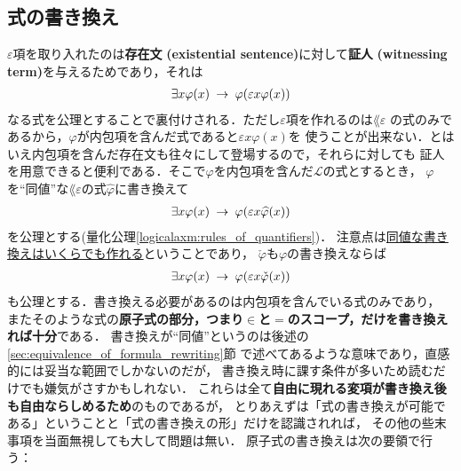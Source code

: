 \subsection{式の書き換え}
\label{subsec:formula_rewriting}
	$\varepsilon$項を取り入れたのは{\bf 存在文}
	{\bf (existential sentence)}に対して{\bf 証人}
	{\bf (witnessing term)}を与えるためであり，それは
	\begin{align}
		\exists x \varphi(x) \hspace{0.25em}\rightarrow\hspace{0.25em} \varphi(\varepsilon x \varphi(x))
	\end{align}
	なる式を公理とすることで裏付けされる．ただし$\varepsilon$項を作れるのは$\lang{\varepsilon}$
	の式のみであるから，$\varphi$が内包項を含んだ式であると$\varepsilon x \varphi(x)$を
	使うことが出来ない．とはいえ内包項を含んだ存在文も往々にして登場するので，それらに対しても
	証人を用意できると便利である．そこで$\varphi$を内包項を含んだ$\mathcal{L}$の式とするとき，
	$\varphi$を``同値''な$\lang{\varepsilon}$の式$\widehat{\varphi}$に書き換えて
	\begin{align}
		\exists x \varphi(x) \hspace{0.25em}\rightarrow\hspace{0.25em} \varphi(\varepsilon x \widehat{\varphi}(x))
	\end{align}
	を公理とする(量化公理\ref{logicalaxm:rules_of_quantifiers})．
	注意点は\underline{同値な書き換えはいくらでも作れる}ということであり，
	$\check{\varphi}$も$\varphi$の書き換えならば
	\begin{align}
		\exists x \varphi(x) \hspace{0.25em}\rightarrow\hspace{0.25em} \varphi(\varepsilon x \check{\varphi}(x))
	\end{align}
	も公理とする．書き換える必要があるのは内包項を含んでいる式のみであり，
	またそのような式の{\bf 原子式の部分，つまり$\in$と$=$のスコープ，だけを書き換えれば十分}である．
	書き換えが``同値''というのは後述の\ref{sec:equivalence_of_formula_rewriting}節
	で述べてあるような意味であり，直感的には妥当な範囲でしかないのだが，
	書き換え時に課す条件が多いため読むだけでも嫌気がさすかもしれない．
	これらは全て{\bf 自由に現れる変項が書き換え後も自由ならしめるため}のものであるが，
	とりあえずは「式の書き換えが可能である」ということと「式の書き換えの形」だけを認識されれば，
	その他の些末事項を当面無視しても大して問題は無い．
	原子式の書き換えは次の要領で行う：
	
